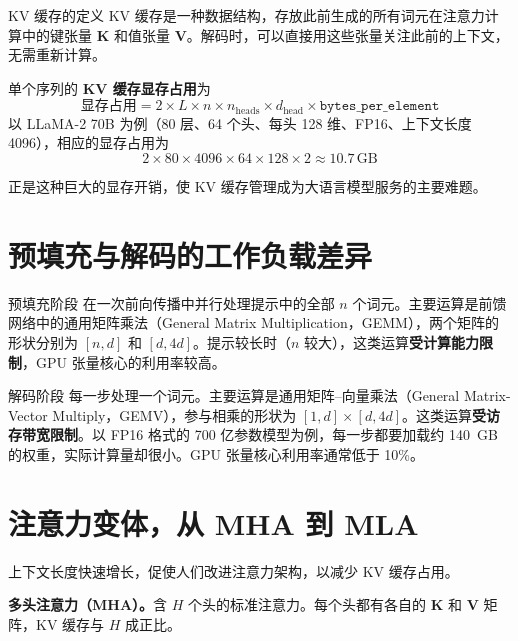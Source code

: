 \begin{definitionbox}{KV 缓存的定义}
KV 缓存是一种数据结构，存放此前生成的所有词元在注意力计算中的键张量 $\mathbf{K}$ 和值张量 $\mathbf{V}$。解码时，可以直接用这些张量关注此前的上下文，无需重新计算。
\end{definitionbox}

单个序列的 \textbf{KV 缓存显存占用}为
\[
\text{显存占用}
=2\times L\times n\times n_{\mathrm{heads}}\times d_{\mathrm{head}}\times\texttt{bytes\_per\_element}
\]
以 LLaMA-2 70B 为例（80 层、64 个头、每头 128 维、FP16、上下文长度 4096），相应的显存占用为
\[
2\times 80\times 4096\times 64\times 128\times 2\approx 10.7\,\mathrm{GB}
\]

正是这种巨大的显存开销，使 KV 缓存管理成为大语言模型服务的主要难题。


\section{预填充与解码的工作负载差异}

\begin{conceptbox}{预填充阶段}
在一次前向传播中并行处理提示中的全部 $n$ 个词元。主要运算是前馈网络中的通用矩阵乘法（General Matrix Multiplication，GEMM），两个矩阵的形状分别为 $[n,d]$ 和 $[d,4d]$。提示较长时（$n$ 较大），这类运算\textbf{受计算能力限制}，GPU 张量核心的利用率较高。
\end{conceptbox}

\begin{conceptbox}{解码阶段}
每一步处理一个词元。主要运算是通用矩阵–向量乘法（General Matrix-Vector Multiply，GEMV），参与相乘的形状为 $[1,d]\times[d,4d]$。这类运算\textbf{受访存带宽限制}。以 FP16 格式的 700 亿参数模型为例，每一步都要加载约 140~GB 的权重，实际计算量却很小。GPU 张量核心利用率通常低于 10\%。
\end{conceptbox}

\section{注意力变体，从 MHA 到 MLA}

上下文长度快速增长，促使人们改进注意力架构，以减少 KV 缓存占用。

\textbf{多头注意力（MHA）。}含 $H$ 个头的标准注意力。每个头都有各自的 $\mathbf{K}$ 和 $\mathbf{V}$ 矩阵，KV 缓存与 $H$ 成正比。

